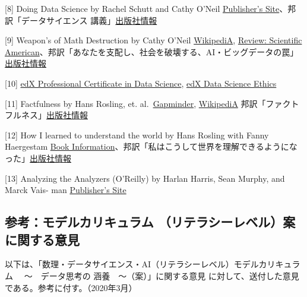 \documentclass[
]{bxjsbook}
\theoremstyle{definition}
\theoremstyle{definition}
\theoremstyle{definition}
\theoremstyle{definition}
\theoremstyle{remark}
\begin{document}
{[}8{]} Doing Data Science by Rachel Schutt and Cathy O'Neil \href{https://www.oreilly.com/library/view/doing-data-science/9781449363871/}{Publisher's Site}、邦訳「データサイエンス 講義」\href{https://www.oreilly.co.jp/books/9784873117010/}{出版社情報}

{[}9{]} Weapon's of Math Destruction by Cathy O'Neil \href{https://en.wikipedia.org/wiki/Weapons_of_Math_Destruction}{WikipediA}, \href{https://blogs.scientificamerican.com/roots-of-unity/review-weapons-of-math-destruction/}{Review: Scientific American}、邦訳「あなたを支配し、社会を破壊する、AI・ビッグデータの罠」\href{http://www.intershift.jp/w_aibg.html}{出版社情報}

{[}10{]} \href{https://online-learning.harvard.edu/series/professional-certificate-data-science}{edX Professional Certificate in Data Science}, \href{https://www.edx.org/course/data-science-ethics}{edX Data Science Ethics}

{[}11{]} Factfulness by Hans Rosling, et. al.~\href{https://www.gapminder.org/factfulness-book/}{Gapminder}, \href{https://en.wikipedia.org/wiki/Factfulness:_Ten_Reasons_We\%27re_Wrong_About_the_World_–_and_Why_Things_Are_Better_Than_You_Think}{WikipediA} 邦訳「ファクトフルネス」\href{https://bookplus.nikkei.com/atcl/catalog/19/P89600/}{出版社情報}

{[}12{]} How I learned to understand the world by Hans Rosling with Fanny Haergestam \href{https://us.macmillan.com/books/9781250266903/howilearnedtounderstandtheworld}{Book Information}、邦訳「私はこうして世界を理解できるようになった」\href{http://www.seidosha.co.jp/book/index.php?id=3351}{出版社情報}

{[}13{]} Analyzing the Analyzers (O'Reilly) by Harlan Harris, Sean Murphy, and Marck Vais- man \href{https://www.oreilly.com/library/view/analyzing-the-analyzers/9781449368388/}{Publisher's Site}

\hypertarget{ux53c2ux8003ux30e2ux30c7ux30ebux30abux30eaux30adux30e5ux30e9ux30e0-ux30eaux30c6ux30e9ux30b7ux30fcux30ecux30d9ux30ebux6848ux306bux95a2ux3059ux308bux610fux898b}{%
\subsection{参考：モデルカリキュラム （リテラシーレベル）案に関する意見}\label{ux53c2ux8003ux30e2ux30c7ux30ebux30abux30eaux30adux30e5ux30e9ux30e0-ux30eaux30c6ux30e9ux30b7ux30fcux30ecux30d9ux30ebux6848ux306bux95a2ux3059ux308bux610fux898b}}

以下は、「数理・データサイエンス・AI（リテラシーレベル）モデルカリキュラム 　～　データ思考の 涵養　～（案）」に関する意見 に対して、送付した意見である。参考に付す。（2020年3月）
\end{document}
